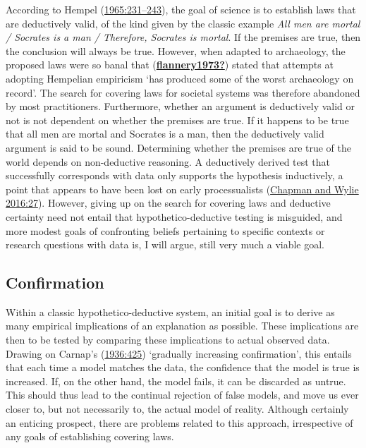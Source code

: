 \documentclass[
  12pt,
  a4paper,
  oneside]{book}
\begin{document}
According to Hempel (\protect\hyperlink{ref-hempel1965}{1965:231--243}), the goal of science is to establish laws that are deductively valid, of the kind given by the classic example \emph{All men are mortal / Socrates is a man / Therefore, Socrates is mortal}. If the premises are true, then the conclusion will always be true. However, when adapted to archaeology, the proposed laws were so banal that (\protect\hyperlink{ref-flannery1973}{\textbf{flannery1973?}}) stated that attempts at adopting Hempelian empiricism `has produced some of the worst archaeology on record'. The search for covering laws for societal systems was therefore abandoned by most practitioners. Furthermore, whether an argument is deductively valid or not is not dependent on whether the premises are true. If it happens to be true that all men are mortal and Socrates is a man, then the deductively valid argument is said to be sound. Determining whether the premises are true of the world depends on non-deductive reasoning. A deductively derived test that successfully corresponds with data only supports the hypothesis inductively, a point that appears to have been lost on early processualists (\protect\hyperlink{ref-chapman2016}{Chapman and Wylie 2016:27}). However, giving up on the search for covering laws and deductive certainty need not entail that hypothetico-deductive testing is misguided, and more modest goals of confronting beliefs pertaining to specific contexts or research questions with data is, I will argue, still very much a viable goal.

\hypertarget{confirmation}{%
\subsection{Confirmation}\label{confirmation}}

Within a classic hypothetico-deductive system, an initial goal is to derive as many empirical implications of an explanation as possible. These implications are then to be tested by comparing these implications to actual observed data. Drawing on Carnap's (\protect\hyperlink{ref-carnap1936}{1936:425}) `gradually increasing confirmation', this entails that each time a model matches the data, the confidence that the model is true is increased. If, on the other hand, the model fails, it can be discarded as untrue. This should thus lead to the continual rejection of false models, and move us ever closer to, but not necessarily to, the actual model of reality. Although certainly an enticing prospect, there are problems related to this approach, irrespective of any goals of establishing covering laws.
\end{document}
